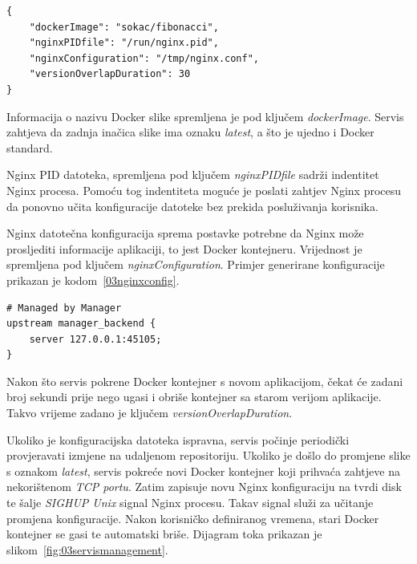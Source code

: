 \begin{lstlisting}[float=h]
{
    "dockerImage": "sokac/fibonacci",
    "nginxPIDfile": "/run/nginx.pid",
    "nginxConfiguration": "/tmp/nginx.conf",
    "versionOverlapDuration": 30
}

\end{lstlisting}

Informacija o nazivu Docker slike spremljena je pod ključem \textit{dockerImage}. Servis
zahtjeva da zadnja inačica slike ima oznaku \textit{latest}, a što je ujedno i Docker standard.

Nginx PID datoteka, spremljena pod ključem \textit{nginxPIDfile} sadrži indentitet Nginx procesa.
Pomoću tog indentiteta moguće je poslati zahtjev Nginx procesu da ponovno učita konfiguracije
datoteke bez prekida posluživanja korisnika.

Nginx datotečna konfiguracija sprema postavke potrebne da Nginx može prosljediti informacije
aplikaciji, to jest Docker kontejneru. Vrijednost je spremljena pod ključem
\textit{nginxConfiguration}. Primjer generirane konfiguracije prikazan je
kodom~\ref{03nginxconfig}.

\begin{lstlisting}[float=h]
# Managed by Manager
upstream manager_backend {
    server 127.0.0.1:45105;
}
\end{lstlisting}

Nakon što servis pokrene Docker kontejner s novom aplikacijom, čekat će zadani broj sekundi prije
nego ugasi i obriše kontejner sa starom verijom aplikacije. Takvo vrijeme zadano je ključem
\textit{versionOverlapDuration}.

Ukoliko je konfiguracijska datoteka ispravna, servis počinje periodički provjeravati izmjene na
udaljenom repositoriju. Ukoliko je došlo do promjene slike s oznakom \textit{latest}, servis pokreće
novi Docker kontejner koji prihvaća zahtjeve na nekorištenom \textit{TCP portu}. Zatim zapisuje novu
Nginx konfiguraciju na tvrdi disk te šalje \textit{SIGHUP Unix} signal Nginx procesu. Takav signal
služi za učitanje promjena konfiguracije. Nakon korisničko definiranog vremena, stari Docker
kontejner se gasi te automatski briše. Dijagram toka prikazan je
slikom~\ref{fig:03servismanagement}.

